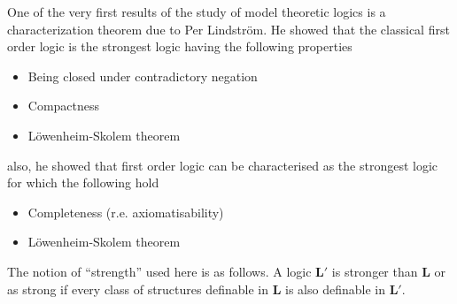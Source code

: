 \documentclass[12pt]{article}
\begin{document}
One of the very first results of the study of model theoretic logics is a characterization theorem due to Per Lindstr\"om. He showed that the classical first order logic is the strongest logic having the following properties

\begin{itemize}
 \item Being closed under contradictory negation
 \item Compactness
 \item L\"owenheim-Skolem theorem 
\end{itemize}

also, he showed that first order logic can be characterised as the strongest logic  for which the following hold

\begin{itemize}
 \item Completeness (r.e. axiomatisability)
 \item L\"owenheim-Skolem theorem
\end{itemize}

The notion of ``strength'' used here is as follows. A logic $\mathbf{L}'$ is stronger than $\mathbf{L}$ or as strong if every class of structures definable in $\mathbf{L}$ is also definable in $\mathbf{L}'$.
\end{document}
